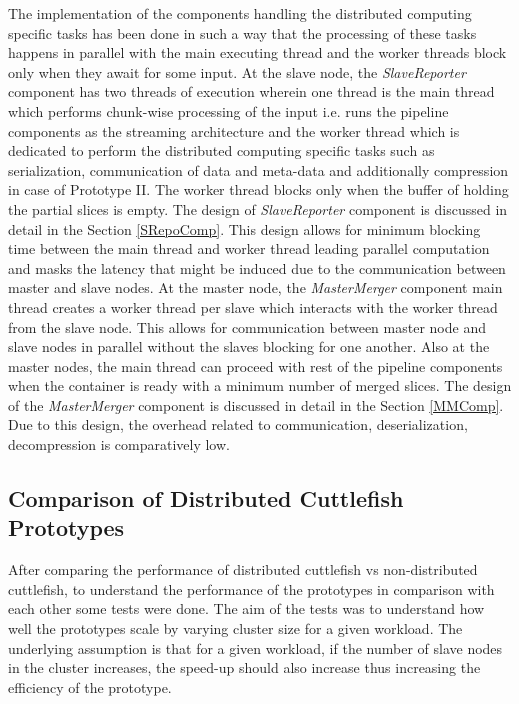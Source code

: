 The implementation of the components handling the distributed computing specific tasks has been done in such a way that the processing of these tasks happens in parallel with the main executing thread and the worker threads block only when they await for some input. At the slave node, the \textit{SlaveReporter} component has two threads of execution wherein one thread is the main thread which performs chunk-wise processing of the input i.e. runs the pipeline components as the streaming architecture and the worker thread which is dedicated to perform the distributed computing specific tasks such as serialization, communication of data and meta-data and additionally compression in case of Prototype II. The worker thread blocks only when the buffer of holding the partial slices is empty. The design of \textit{SlaveReporter} component is discussed in detail in the Section \ref{SRepoComp}. This design allows for minimum blocking time between the main thread and worker thread leading parallel computation and masks the latency that might be induced due to the communication between master and slave nodes. At the master node, the \textit{MasterMerger} component main thread creates a worker thread per slave which interacts with the worker thread from the slave node. This allows for communication between master node and slave nodes in parallel without the slaves blocking for one another. Also at the master nodes, the main thread can proceed with rest of the pipeline components when the container is ready with a minimum number of merged slices. The design of the \textit{MasterMerger} component is discussed in detail in the Section \ref{MMComp}. Due to this design, the overhead related to communication, deserialization, decompression is comparatively low. \newline
 

\subsection{Comparison of Distributed Cuttlefish Prototypes} \label{ProtoComp}

After comparing the performance of distributed cuttlefish vs non-distributed cuttlefish, to understand the performance of the prototypes in comparison with each other some tests were done. The aim of the tests was to understand how well the prototypes scale by varying cluster size for a given workload. The underlying assumption is that for a given workload, if the number of slave nodes in the cluster increases, the speed-up should also increase thus increasing the efficiency of the prototype. 

